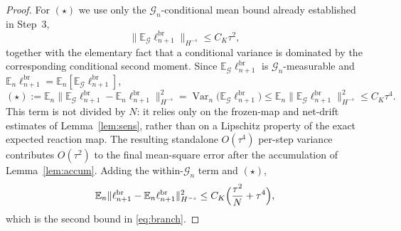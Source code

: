 \documentclass[a4paper,fleqn]{cas-sc}
\theoremstyle{definition}
\theoremstyle{remark}
\begin{document}
\begin{proof}
For $(\star)$ we use only the $\mathcal G_n$-conditional mean bound already established in
Step~3,
\[
\|\mathbb E_{\mathcal G}\ell^{\mathrm{br}}_{n+1}\|_{H^{-s}}\le C_K\tau^2 ,
\]
together with the elementary fact that a conditional variance is dominated by the
corresponding conditional second moment. Since $\mathbb E_{\mathcal G}\ell^{\mathrm{br}}_{n+1}$
is $\mathcal G_n$-measurable and $\mathbb E_n\ell^{\mathrm{br}}_{n+1}
=\mathbb E_n[\mathbb E_{\mathcal G}\ell^{\mathrm{br}}_{n+1}]$,
\[
(\star)
:=\mathbb E_n\bigl\|\mathbb E_{\mathcal G}\ell^{\mathrm{br}}_{n+1}-\mathbb E_n\ell^{\mathrm{br}}_{n+1}\bigr\|_{H^{-s}}^2
=\operatorname{Var}_n\bigl(\mathbb E_{\mathcal G}\ell^{\mathrm{br}}_{n+1}\bigr)
\le\mathbb E_n\bigl\|\mathbb E_{\mathcal G}\ell^{\mathrm{br}}_{n+1}\bigr\|_{H^{-s}}^2
\le C_K\tau^4 .
\]
This term is not divided by $N$: it relies only on the frozen-map and net-drift estimates of
Lemma~\ref{lem:sens}, rather than on a Lipschitz property of the exact expected reaction map. The
resulting standalone $O(\tau^4)$ per-step variance contributes $O(\tau^2)$ to the final mean-square
error after the accumulation of Lemma~\ref{lem:accum}. Adding the within-$\mathcal G_n$ term and $(\star)$,
\[
\mathbb E_n\|\ell^{\mathrm{br}}_{n+1}-\mathbb E_n\ell^{\mathrm{br}}_{n+1}\|_{H^{-s}}^2
\le C_K\Bigl(\frac{\tau^2}{N}+\tau^4\Bigr),
\]
which is the second bound in \eqref{eq:branch}.
\end{proof}
\end{document}
